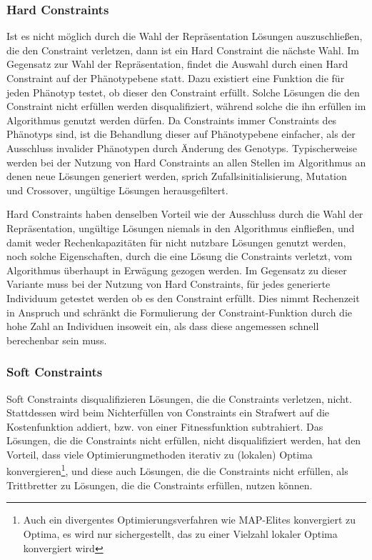 \subsubsection{Hard Constraints}

Ist es nicht möglich durch die Wahl der Repräsentation Lösungen auszuschließen, die den Constraint verletzen, dann ist ein Hard Constraint die nächste Wahl.
Im Gegensatz zur Wahl der Repräsentation, findet die Auswahl durch einen Hard Constraint auf der Phänotypebene statt.
Dazu existiert eine Funktion die für jeden Phänotyp testet, ob dieser den Constraint erfüllt.
Solche Lösungen die den Constraint nicht erfüllen werden disqualifiziert, während solche die ihn erfüllen im Algorithmus genutzt werden dürfen.
Da Constraints immer Constraints des Phänotyps sind, ist die Behandlung dieser auf Phänotypebene einfacher, als der Ausschluss invalider Phänotypen durch Änderung des Genotyps.
Typischerweise werden bei der Nutzung von Hard Constraints an allen Stellen im Algorithmus an denen neue Lösungen generiert werden, sprich Zufallsinitialisierung, Mutation und Crossover, ungültige Lösungen herausgefiltert.

Hard Constraints haben denselben Vorteil wie der Ausschluss durch die Wahl der Repräsentation, ungültige Lösungen niemals in den Algorithmus einfließen, und damit weder Rechenkapazitäten für nicht nutzbare Lösungen genutzt werden, noch solche Eigenschaften, durch die eine Lösung die Constraints verletzt, vom Algorithmus überhaupt in Erwägung gezogen werden.
Im Gegensatz zu dieser Variante muss bei der Nutzung von Hard Constraints, für jedes generierte Individuum getestet werden ob es den Constraint erfüllt.
Dies nimmt Rechenzeit in Anspruch und schränkt die Formulierung der Constraint-Funktion durch die hohe Zahl an Individuen insoweit ein, als dass diese angemessen schnell berechenbar sein muss.



\subsubsection{Soft Constraints}
Soft Constraints disqualifizieren Lösungen, die die Constraints verletzen, nicht.
Stattdessen wird beim Nichterfüllen von Constraints ein Strafwert auf die Kostenfunktion addiert, bzw. von einer Fitnessfunktion subtrahiert.
Das Lösungen, die die Constraints nicht erfüllen, nicht disqualifiziert werden, hat den Vorteil, dass viele Optimierungmethoden iterativ zu (lokalen) Optima konvergieren\footnote{Auch ein divergentes Optimierungsverfahren wie MAP-Elites konvergiert zu Optima, es wird nur sichergestellt, das zu einer Vielzahl lokaler Optima konvergiert wird}, 
und diese auch Lösungen, die die Constraints nicht erfüllen, als Trittbretter zu Lösungen, die die Constraints erfüllen, nutzen können.


